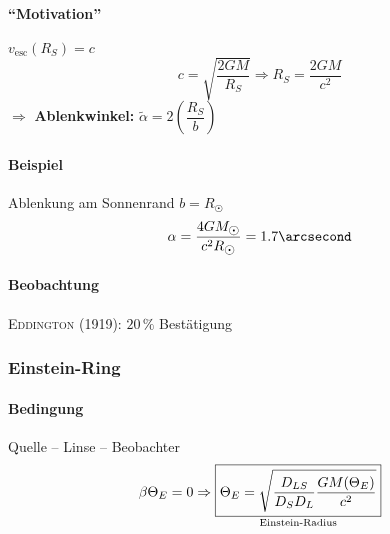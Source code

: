 \paragraph{"`Motivation"'} $v_{\mathrm{esc}} (R_S) = c$
\[ c = \sqrt{\frac{2GM}{R_S}} \Rightarrow \boxed{R_S = \frac{2GM}{c^2}} \]
$\Rightarrow$ \textbf{Ablenkwinkel:} $\boxed{\tilde \alpha = 2\left(\dfrac{R_S}{b}\right)}$

\paragraph{Beispiel} Ablenkung am Sonnenrand $\boxed{b = R_{\astrosun}}$
\[ \alpha = \frac{4GM_{\astrosun}}{c^2 R_{\astrosun}} = 1.7\arcsecond \]
\paragraph{Beobachtung} \textsc{Eddington} (1919): $20\,\%$ Bestätigung

\subsubsection{Einstein-Ring}
\paragraph{Bedingung} Quelle -- Linse -- Beobachter
\[ \beta{\Theta_E} = 0 \Rightarrow \underset{\mathclap{\text{Einstein-Radius}}}{\boxed{\Theta_E = \sqrt{\frac{D_{LS}}{D_S D_L} \frac{GM(\Theta_E)}{c^2}}}} \]

